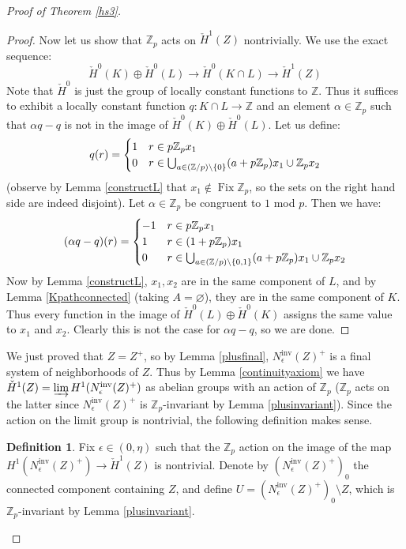 \documentclass[12pt]{article}
\theoremstyle{plain}
\theoremstyle{definition}
\newtheorem{definition}[theorem]{Definition}
\theoremstyle{remark}
\numberwithin{equation}{section}
\begin{document}
\begin{proof}[Proof of Theorem \ref{hs3}]
\begin{proof}
Now let us show that $\mathbb Z_p$ acts on $\check H^1(Z)$ nontrivially.  We use the exact sequence:
\begin{equation}
\check H^0(K)\oplus\check H^0(L)\to\check H^0(K\cap L)\to\check H^1(Z)
\end{equation}
Note that $\check H^0$ is just the group of locally constant functions to $\mathbb Z$.  Thus it suffices to exhibit a locally constant function $q:K\cap L\to\mathbb Z$ and an element $\alpha\in\mathbb Z_p$ such that $\alpha q-q$ is not in the image of $\check H^0(K)\oplus\check H^0(L)$.  Let us define:
\begin{equation}
q(r)=\begin{cases}1&r\in p\mathbb Z_px_1\cr 0&r\in\bigcup_{a\in(\mathbb Z/p)\setminus\{0\}}(a+p\mathbb Z_p)x_1\cup\mathbb Z_px_2\end{cases}
\end{equation}
(observe by Lemma \ref{constructL} that $x_1\notin\operatorname{Fix}\mathbb Z_p$, so the sets on the right hand side are indeed disjoint).  Let $\alpha\in\mathbb Z_p$ be congruent to $1$ mod $p$.  Then we have:
\begin{equation}
(\alpha q-q)(r)=\begin{cases}-1&r\in p\mathbb Z_px_1\cr 1&r\in(1+p\mathbb Z_p)x_1\cr 0&r\in\bigcup_{a\in(\mathbb Z/p)\setminus\{0,1\}}(a+p\mathbb Z_p)x_1\cup\mathbb Z_px_2\end{cases}
\end{equation}
Now by Lemma \ref{constructL}, $x_1,x_2$ are in the same component of $L$, and by Lemma \ref{Kpathconnected} (taking $A=\varnothing$), they are in the same component of $K$.  Thus every function in the image of $\check H^0(L)\oplus\check H^0(K)$ assigns the same value to $x_1$ and $x_2$.  Clearly this is not the case for $\alpha q-q$, so we are done.
\end{proof}

We just proved that $Z=Z^+$, so by Lemma \ref{plusfinal}, $N^{\operatorname{inv}}_\epsilon(Z)^+$ is a final system of neighborhoods of $Z$.  Thus by Lemma \ref{continuityaxiom} we have $\check H^1(Z)=\varinjlim H^1(N^{\operatorname{inv}}_\epsilon(Z)^+)$ as abelian groups with an action of $\mathbb Z_p$ ($\mathbb Z_p$ acts on the latter since $N^{\operatorname{inv}}_\epsilon(Z)^+$ is $\mathbb Z_p$-invariant by Lemma \ref{plusinvariant}).  Since the action on the limit group is nontrivial, the following definition makes sense.

\begin{definition}\label{Udef}
Fix $\epsilon\in(0,\eta)$ such that the $\mathbb Z_p$ action on the image of the map $H^1(N^{\operatorname{inv}}_\epsilon(Z)^+)\to\check H^1(Z)$ is nontrivial.  Denote by $(N^{\operatorname{inv}}_\epsilon(Z)^+)_0$ the connected component containing $Z$, and define $U=(N^{\operatorname{inv}}_\epsilon(Z)^+)_0\setminus Z$, which is $\mathbb Z_p$-invariant by Lemma \ref{plusinvariant}.
\end{definition}


\end{proof}
\end{document}
